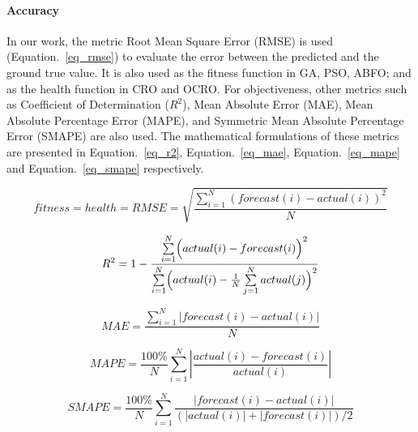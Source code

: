 \documentclass[review,3p,authoryear]{elsarticle}
\begin{document}
\paragraph{\textbf{Accuracy}} In our work, the metric Root Mean Square Error (RMSE) is used (Equation.~\ref{eq_rmse}) to evaluate the error between the predicted and the ground true value. 
It is also used as the fitness function in GA, PSO, ABFO; and as the health function in CRO and OCRO. 
For objectiveness, other metrics such as 
	Coefficient of Determination ($R^2$), 
	Mean Absolute Error (MAE), 
	Mean Absolute Percentage Error (MAPE), and 
	Symmetric Mean Absolute Percentage Error (SMAPE) are also used. 
The mathematical formulations of these metrics are presented in Equation.~\ref{eq_r2}, Equation.~\ref{eq_mae}, Equation.~\ref{eq_mape} and Equation.~\ref{eq_smape} respectively.

 \small

\begin{equation} \label{eq_rmse}
fitness = health = RMSE = \sqrt{ \frac{\sum_{i=1}^N (forecast(i) - actual(i))^2 }{N} }
\end{equation}

\begin{equation} \label{eq_r2}
R^2 = 1 - \displaystyle \frac{ \sum\limits_{i=1}^N \Bigl( actual(i) - forecast(i) \Bigr)^2} { \sum\limits_{i=1}^N \Bigl( actual(i) - \frac{1}{N} \sum\limits_{j=1}^N actual(j) \Bigr)^2  }
\end{equation}

\begin{equation} \label{eq_mae}
MAE = \frac{\sum_{i=1}^N|forecast(i) - actual(i)|}{N}
\end{equation}

\begin{equation} \label{eq_mape}
MAPE = \frac{100\%}{N} \sum_{i=1}^N \left\lvert \frac{actual(i) - forecast(i)}{actual(i)} \right\rvert
\end{equation}

\begin{equation} \label{eq_smape}
SMAPE = \frac{100\%}{N} \sum_{i=1}^N \frac{ |forecast(i) - actual(i)| }{ (|actual(i)| + |forecast(i)|)/2  }
\end{equation}


\normalsize
\end{document}
